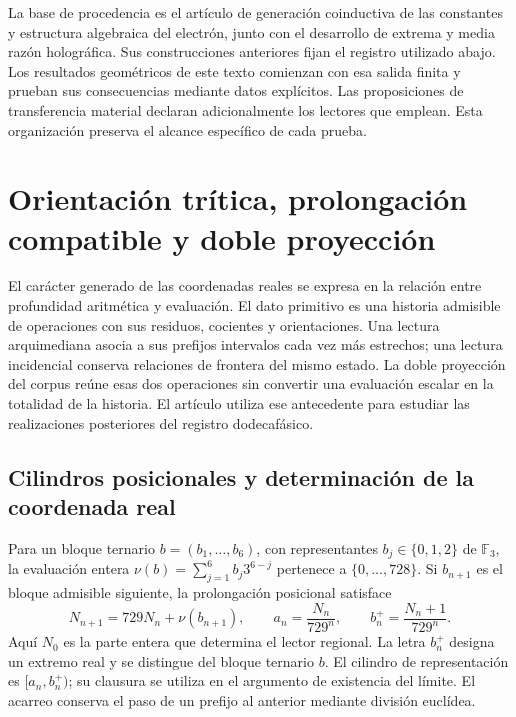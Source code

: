 \documentclass[a4paper,10pt]{article}
\theoremstyle{definition}\newtheorem{definition}[theorem]{Definición}
\theoremstyle{remark}\newtheorem{remark}[theorem]{Observación}
\numberwithin{equation}{section}
\begin{document}
La base de procedencia es el artículo de generación coinductiva de las
constantes y estructura algebraica del electrón, junto con el desarrollo
de extrema y media razón holográfica. Sus construcciones anteriores fijan
el registro utilizado abajo. Los resultados geométricos de este texto comienzan
con esa salida finita y prueban sus consecuencias mediante datos explícitos. Las
proposiciones de transferencia material declaran adicionalmente los
lectores que emplean. Esta organización preserva el alcance específico de
cada prueba.

\section{Orientación trítica, prolongación compatible y doble proyección}
\label{sec:trit-projection}

El carácter generado de las coordenadas reales se expresa en la relación
entre profundidad aritmética y evaluación. El dato primitivo es una historia
admisible de operaciones con sus residuos, cocientes y orientaciones. Una
lectura arquimediana asocia a sus prefijos intervalos cada vez más estrechos;
una lectura incidencial conserva relaciones de frontera del mismo estado.
La doble proyección del corpus \cite{hmtI,HMT-IX} reúne esas dos operaciones
sin convertir una evaluación escalar en la totalidad de la historia. El
artículo utiliza ese antecedente para estudiar las realizaciones posteriores
del registro dodecafásico.

\subsection{Cilindros posicionales y determinación de la coordenada real}

Para un bloque ternario \(b=(b_1,\ldots,b_6)\), con representantes
\(b_j\in\{0,1,2\}\) de \(\mathbb F_3\), la evaluación entera
\(\nu(b)=\sum_{j=1}^6b_j3^{6-j}\) pertenece a
\(\{0,\ldots,728\}\). Si \(b_{n+1}\) es el bloque admisible siguiente,
la prolongación posicional satisface
\[
 N_{n+1}=729N_n+\nu(b_{n+1}),\qquad
 a_n=\frac{N_n}{729^n},\qquad b_n^+=\frac{N_n+1}{729^n}.
\]
Aquí \(N_0\) es la parte entera que determina el lector regional. La letra
\(b_n^+\) designa un extremo real y se distingue del bloque ternario \(b\).
El cilindro de representación es \([a_n,b_n^+)\); su clausura se utiliza
en el argumento de existencia del límite. El acarreo conserva el paso de
un prefijo al anterior mediante división euclídea.
\end{document}
